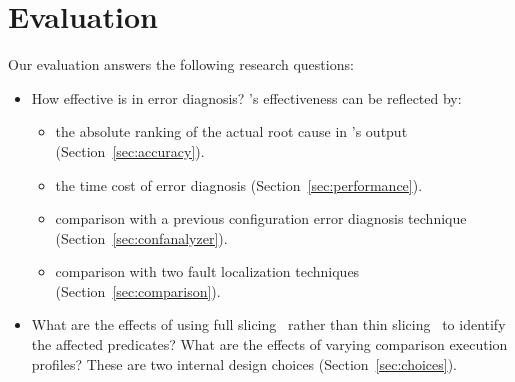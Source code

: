 \section{Evaluation}
\label{sec:evaluation}


Our evaluation answers the following research questions:



\begin{itemize}
\item How effective is \ourtool in error diagnosis? \ourtool's effectiveness can be reflected by:
\begin{itemize}
  \item the absolute ranking of the actual root cause in \ourtool's output (Section~\ref{sec:accuracy}).
  \item the time cost of error diagnosis (Section~\ref{sec:performance}).
  \item comparison with a previous configuration error diagnosis technique (Section~\ref{sec:confanalyzer}).
  \item comparison with two fault localization techniques (Section~\ref{sec:comparison}).
\end{itemize}
\item What are the effects of using full slicing~\cite{Horwitz:1988}
 rather than thin slicing~\cite{Sridharan:2007} to identify
the affected predicates?  What are the effects of varying comparison execution profiles?
These are two internal design choices (Section~\ref{sec:choices}). %
\end{itemize}



